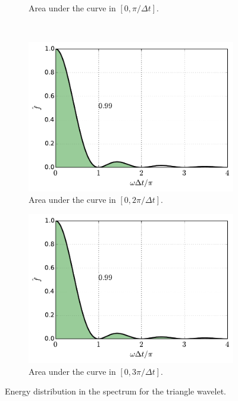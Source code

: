 \documentclass[12pt,letterpaper]{article}
\begin{document}
{\begin{figure}[H]
\begin{subfigure}[b]{0.45\textwidth}
        \caption{Area under the curve in $[0,\pi/\Delta t]$.}
    \end{subfigure}\\
    \begin{subfigure}[b]{0.45\textwidth}
        \includegraphics[width=\textwidth]{img/triangle_area=3.pdf}
        \caption{Area under the curve in $[0,2\pi/\Delta t]$.}
    \end{subfigure}
    \begin{subfigure}[b]{0.45\textwidth}
        \includegraphics[width=\textwidth]{img/triangle_area=4.pdf}
        \caption{Area under the curve in $[0,3\pi/\Delta t]$.}
    \end{subfigure}
    \caption{Energy distribution in the spectrum for the triangle wavelet.}
    \label{fig:triangle-areas}
\end{figure}



}
\end{document}
